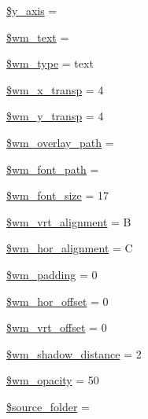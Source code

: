 \begin{DoxyCompactItemize}
\item 
\mbox{\hyperlink{class_c_i___image__lib_ac60512307da37068c0821f7dc2488608}{\$y\+\_\+axis}} = \textquotesingle{}\textquotesingle{}
\item 
\mbox{\hyperlink{class_c_i___image__lib_a412eac22e8d585a33f28f132f13d482b}{\$wm\+\_\+text}} = \textquotesingle{}\textquotesingle{}
\item 
\mbox{\hyperlink{class_c_i___image__lib_a530808b613890909a92bf6096401e9be}{\$wm\+\_\+type}} = \textquotesingle{}text\textquotesingle{}
\item 
\mbox{\hyperlink{class_c_i___image__lib_a720496900551e5c29b11a732fb4f35ab}{\$wm\+\_\+x\+\_\+transp}} = 4
\item 
\mbox{\hyperlink{class_c_i___image__lib_aa9ab81b196739723a7c38d9431c9fa11}{\$wm\+\_\+y\+\_\+transp}} = 4
\item 
\mbox{\hyperlink{class_c_i___image__lib_a82ec5b8a6822dc7f9c70f4b5aafdebd4}{\$wm\+\_\+overlay\+\_\+path}} = \textquotesingle{}\textquotesingle{}
\item 
\mbox{\hyperlink{class_c_i___image__lib_a6870985f3e6bbf1a29e5875c054598f4}{\$wm\+\_\+font\+\_\+path}} = \textquotesingle{}\textquotesingle{}
\item 
\mbox{\hyperlink{class_c_i___image__lib_a0ea2a2f73623aa0631670017a4e68419}{\$wm\+\_\+font\+\_\+size}} = 17
\item 
\mbox{\hyperlink{class_c_i___image__lib_a1c52f46917a30e084db07a8c8e13af86}{\$wm\+\_\+vrt\+\_\+alignment}} = \textquotesingle{}B\textquotesingle{}
\item 
\mbox{\hyperlink{class_c_i___image__lib_a74d790b77baa0c22cd0b812abc41765c}{\$wm\+\_\+hor\+\_\+alignment}} = \textquotesingle{}C\textquotesingle{}
\item 
\mbox{\hyperlink{class_c_i___image__lib_ab1f63f5ae604d060dbc39653f6440826}{\$wm\+\_\+padding}} = 0
\item 
\mbox{\hyperlink{class_c_i___image__lib_aed778e3e9ecb74e8c61d8c4894581f7f}{\$wm\+\_\+hor\+\_\+offset}} = 0
\item 
\mbox{\hyperlink{class_c_i___image__lib_a577602650e0c67f9f4bfcdeda075fa50}{\$wm\+\_\+vrt\+\_\+offset}} = 0
\item 
\mbox{\hyperlink{class_c_i___image__lib_a3d5174ca66ce7149799b5830873aa747}{\$wm\+\_\+shadow\+\_\+distance}} = 2
\item 
\mbox{\hyperlink{class_c_i___image__lib_a9cc2d95dbcbb26a2f3f0c7416fc5920b}{\$wm\+\_\+opacity}} = 50
\item 
\mbox{\hyperlink{class_c_i___image__lib_a8fa5462b549251df178487f869c49800}{\$source\+\_\+folder}} = \textquotesingle{}\textquotesingle{}

\end{DoxyCompactItemize}
